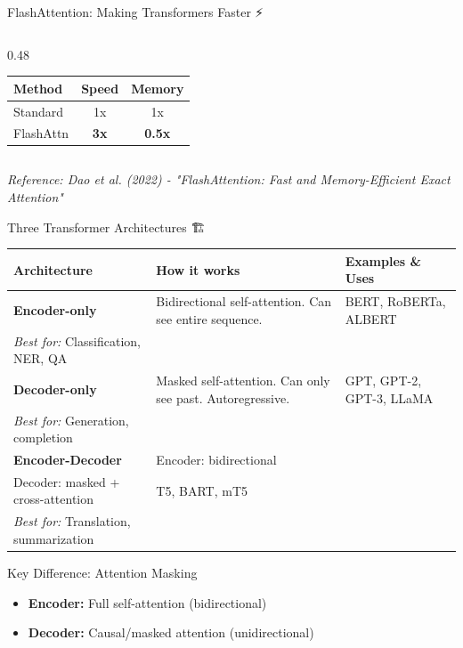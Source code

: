 \documentclass[aspectratio=169]{beamer}
\begin{document}
\begin{frame}[shrink=10]{FlashAttention: Making Transformers Faster ⚡}
\begin{columns}[T]
\begin{column}{0.48\textwidth}
\begin{center}
\begin{tabular}{lcc}
\toprule
\textbf{Method} & \textbf{Speed} & \textbf{Memory} \\
\midrule
Standard & 1x & 1x \\
FlashAttn & \textbf{3x} & \textbf{0.5x} \\
\bottomrule
\end{tabular}
\end{center}
\end{column}
\end{columns}

\vspace{0.5em}
\small
\textit{Reference: Dao et al. (2022) - "FlashAttention: Fast and Memory-Efficient Exact Attention"}
\end{frame}

\begin{frame}{Three Transformer Architectures 🏗️}
\begin{center}
\begin{tabular}{p{3cm}p{4cm}p{4cm}}
\toprule
\textbf{Architecture} & \textbf{How it works} & \textbf{Examples \& Uses} \\
\midrule
\textbf{Encoder-only} &
Bidirectional self-attention. Can see entire sequence. &
BERT, RoBERTa, ALBERT\\
\textit{Best for:} Classification, NER, QA \\
\midrule
\textbf{Decoder-only} &
Masked self-attention. Can only see past. Autoregressive. &
GPT, GPT-2, GPT-3, LLaMA\\
\textit{Best for:} Generation, completion \\
\midrule
\textbf{Encoder-Decoder} &
Encoder: bidirectional\\
Decoder: masked + cross-attention &
T5, BART, mT5\\
\textit{Best for:} Translation, summarization \\
\bottomrule
\end{tabular}
\end{center}

\vspace{1em}

\begin{block}{Key Difference: Attention Masking}
\begin{itemize}\setlength{\itemsep}{0pt}
    \item \textbf{Encoder:} Full self-attention (bidirectional)
    \item \textbf{Decoder:} Causal/masked attention (unidirectional)
\end{itemize}
\end{block}
\end{frame}
\end{document}

